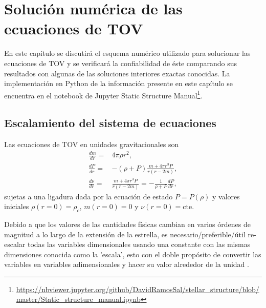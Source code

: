 \chapter{Solución numérica de las ecuaciones de TOV}\label{NumSol}
\noindent En este capítulo se discutirá el esquema numérico utilizado para solucionar las ecuaciones de TOV y se verificará la confiabilidad de éste comparando sus resultados con algunas de las soluciones interiores exactas conocidas.
La implementación en Python de la información presente en este capítulo se encuentra en el notebook de Jupyter Static Structure Manual\footnote{\url{https://nbviewer.jupyter.org/github/DavidRamosSal/stellar_structure/blob/master/Static_structure_manual.ipynb}}.

\section{Escalamiento del sistema de ecuaciones}
\noindent Las ecuaciones de TOV en unidades gravitacionales son
\begin{align}
    \frac{dm}{dr}=&4\pi \rho r^2 ,\\
    \frac{dP}{dr}=&-(\rho+P)\frac{m+4\pi r^3 P}{r(r-2m)} , \\
    \frac{d\nu}{dr}=& \frac{m+4\pi r^3 P}{r(r-2m)} =  -\frac{1}{\rho+P}\frac{dP}{dr},
\end{align}
sujetas a una ligadura dada por la ecuación de estado $P=P(\rho)$ y valores iniciales $\rho(r=0)=\rho_c$, $m(r=0)=0$ y $\nu(r=0)=\text{cte}$.

Debido a que los valores de las cantidades físicas cambian en varios órdenes de magnitud a lo largo de la extensión de la estrella, es necesario/preferible/útil re-escalar todas las variables dimensionales usando una constante con las mismas dimensiones conocida como la 'escala', esto con el doble propósito de convertir las variables en variables adimensionales y hacer su valor alrededor de la unidad \cite{Langtangen2016}.

